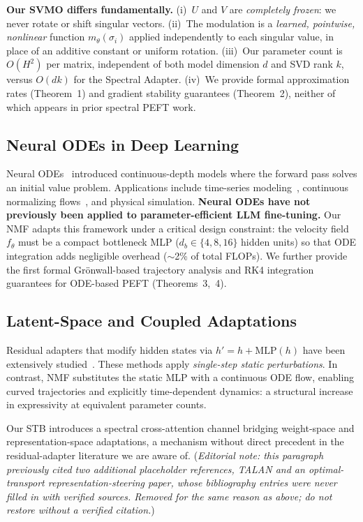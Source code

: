 \documentclass[conference]{IEEEtran}
\newcommand{\svmo}{\textsc{SVMO}}
\newcommand{\nmf}{\textsc{NMF}}
\newcommand{\stb}{\textsc{STB}}
\begin{document}
\textbf{Our \svmo{} differs fundamentally.} (i)~$U$ and $V$ are \textit{completely frozen}: we never rotate or shift singular vectors. (ii)~The modulation is a \textit{learned, pointwise, nonlinear} function $m_\theta(\sigma_i)$ applied independently to each singular value, in place of an additive constant or uniform rotation. (iii)~Our parameter count is $O(H^2)$ per matrix, independent of both model dimension $d$ and SVD rank $k$, versus $O(dk)$ for the Spectral Adapter. (iv)~We provide formal approximation rates (Theorem~1) and gradient stability guarantees (Theorem~2), neither of which appears in prior spectral PEFT work.

\subsection{Neural ODEs in Deep Learning}

Neural ODEs~\cite{chen2018neuralode} introduced continuous-depth models where the forward pass solves an initial value problem. Applications include time-series modeling~\cite{rubanova2019latentode}, continuous normalizing flows~\cite{grathwohl2018ffjord}, and physical simulation. \textbf{Neural ODEs have not previously been applied to parameter-efficient LLM fine-tuning.} Our \nmf{} adapts this framework under a critical design constraint: the velocity field $f_\theta$ must be a compact bottleneck MLP ($d_b \in \{4,8,16\}$ hidden units) so that ODE integration adds negligible overhead ($\sim$2\% of total FLOPs). We further provide the first formal Gr\"onwall-based trajectory analysis and RK4 integration guarantees for ODE-based PEFT (Theorems~3,~4).

\subsection{Latent-Space and Coupled Adaptations}

Residual adapters that modify hidden states via $h' = h + \text{MLP}(h)$ have been extensively studied~\cite{houlsby2019adapters,pfeiffer2020adapterfusion}. These methods apply \textit{single-step static perturbations}. In contrast, \nmf{} substitutes the static MLP with a continuous ODE flow, enabling curved trajectories and explicitly time-dependent dynamics: a structural increase in expressivity at equivalent parameter counts.

Our \stb{} introduces a spectral cross-attention channel bridging weight-space and representation-space adaptations, a mechanism without direct precedent in the residual-adapter literature we are aware of. (\textit{Editorial note: this paragraph previously cited two additional placeholder references, TALAN and an optimal-transport representation-steering paper, whose bibliography entries were never filled in with verified sources. Removed for the same reason as above; do not restore without a verified citation.})
\end{document}
